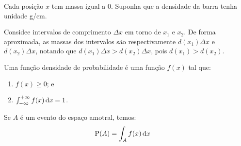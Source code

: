 \begin{example}
\begin{center}
    \end{center}

    Cada posição $x$ tem massa igual a 0.
    Suponha que a densidade da barra tenha unidade
    \unit[per-mode = symbol]{\gram\per\centi\meter}.

    Considee intervalos de comprimento $\Delta x$ em torno
    de $x_1$ e $x_2$. De forma aproximada, as massas dos intervalos
    são respectivamente $d(x_1)\Delta x$ e $d(x_2)\Delta x$,
    notando que $d(x_1)\Delta x > d(x_2)\Delta x$, pois $d(x_1) > d(x_2)$.
\end{example}

\begin{definition}\label{def:ch02-fdp}
    Uma função densidade de probabilidade é uma função $f(x)$ tal que:
    \begin{enumerate}
        \item $f(x) \geq 0$; e
        \item $\int_{-\infty}^{+\infty} f(x) \,\mathrm{d} x = 1$.
    \end{enumerate}
\end{definition}

Se $A$ é um evento do espaço amotral, temos:
\begin{align}
    \operatorname{P}(A) &= \int_A f(x) \,\mathrm{d} x
        \label{eq:ch02-prob-continua}
\end{align}

